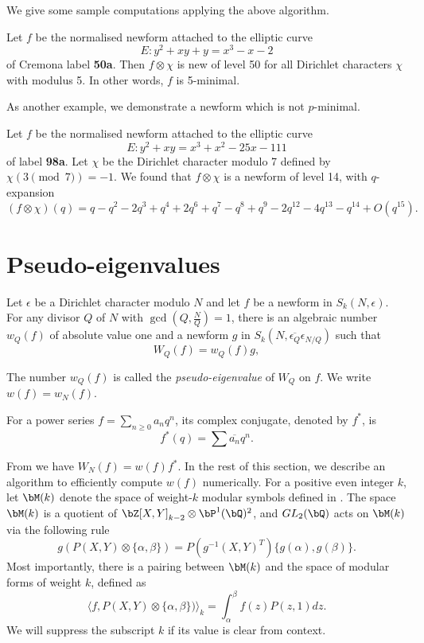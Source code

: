 \documentclass [11pt, proquest] {uwthesis}[2015/03/03]
\begin{document}
We give some sample computations applying the above algorithm. 

\begin{Example}
Let $f$ be the normalised newform attached to the elliptic curve 
\[
	E: y^2 + x y + y = x^{3} -  x - 2
\]
of Cremona label {\bf 50a}. Then $f \otimes \chi$ is new of level 50 for all Dirichlet characters $\chi$ with modulus 5. 
In other words, $f$ is 5-minimal. 
\end{Example}

As another example, we demonstrate a newform which is not $p$-minimal. 
\begin{Example}
Let $f$ be the normalised newform attached to the elliptic curve 
\[
E: y^2 + x y = x^{3} + x^{2} - 25 x - 111
\]
of label {\bf 98a}. Let $\chi$ be the Dirichlet character modulo 7 defined by $\chi(3 \pmod{7}) = -1$. 
We found that $f \otimes \chi$ is a newform of level 14, with $q$-expansion
\[
 (f \otimes \chi) (q) = q - q^{2} - 2q^{3} + q^{4} + 2q^{6} + q^{7} - q^{8} + q^{9} - 2q^{12} - 4q^{13} - q^{14} + O(q^{15}).
\]
\end{Example}


\section{Pseudo-eigenvalues} 

Let $\epsilon$ be a Dirichlet character modulo $N$ and let $f$ be a newform in $S_k(N,\epsilon)$. For any divisor $Q$ of $N$ with $\gcd(Q, \frac{N}{Q}) =1$, there is an algebraic number  $w_Q(f)$ of absolute value one  and  a newform $g$ in $S_k(N, \overline{\epsilon_Q} \epsilon_{N/Q})$ such that 
\[
	W_Q(f) = w_Q(f) g, 
\]


\begin{Definition}
The number $w_Q(f)$ is called the {\it pseudo-eigenvalue} of $W_Q$ on $f$. We write $w(f) = w_N(f)$. 
\end{Definition}

For a power series  $f = \sum_{n \geq 0} a_nq^n$, its complex conjugate, denoted by $f^*$, is $$f^*(q) = \sum \overline{a_n}q^n.$$ 

From \cite{atkin1978twists} we have $W_N(f) = w(f) f^*$. In the rest of this section, we describe an algorithm to efficiently compute $w(f)$ numerically.  For a positive even integer $k$, let $\bM(k)$ denote the space of weight-$k$ modular symbols defined in \cite{stein2007modular}. The space $\bM(k)$ is a quotient of $\bZ[X,Y]_{k-2} \otimes \bP^1(\bQ)^2$, and $GL_2(\bQ)$ acts on $\bM(k)$ via the following rule
\[
	g (P(X,Y) \otimes \{\alpha, \beta\}) = P( g^{-1}(X,Y)^T) \{g(\alpha), g(\beta)\}.
\]
Most importantly, there is a pairing between $\bM(k)$ and the space of modular forms of weight $k$, defined as
\[
		\langle f, P(X,Y) \otimes \{\alpha, \beta\}) \rangle_k = \int_{\alpha}^{\beta} f(z) P(z,1) dz.
\]
We will suppress the subscript $k$ if its value is clear from context.
\end{document}
